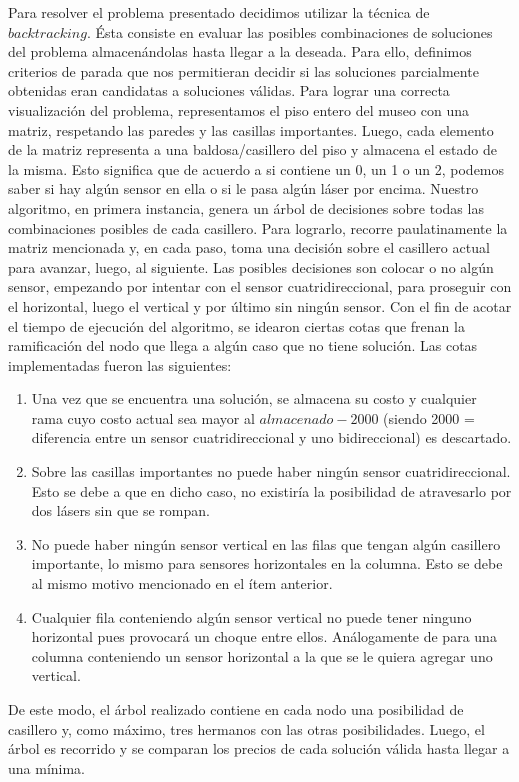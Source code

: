 Para resolver el problema presentado decidimos utilizar la técnica de $backtracking$. Ésta consiste en evaluar las posibles combinaciones de soluciones del problema almacenándolas hasta llegar a la deseada. Para ello, definimos criterios de parada que nos permitieran decidir si las soluciones parcialmente obtenidas eran candidatas a soluciones válidas.\newline
\newline
Para lograr una correcta visualización del problema, representamos el piso entero del museo con una matriz, respetando las paredes y las casillas importantes. Luego, cada elemento de la matriz representa a una baldosa/casillero del piso y almacena el estado de la misma. Esto significa que de acuerdo a si contiene un 0, un 1 o un 2, podemos saber si hay algún sensor en ella o si le pasa algún láser por encima.\newline
\newline
Nuestro algoritmo, en primera instancia, genera un árbol de decisiones sobre todas las combinaciones posibles de cada casillero. Para lograrlo, recorre paulatinamente la matriz mencionada y, en cada paso, toma una decisión sobre el casillero actual para avanzar, luego, al siguiente. Las posibles decisiones son colocar o no algún sensor, empezando por intentar con el sensor cuatridireccional, para proseguir con el horizontal, luego el vertical y por último sin ningún sensor. Con el fin de acotar el tiempo de ejecución del algoritmo, se idearon ciertas cotas que frenan la ramificación del nodo que llega a algún caso que no tiene solución. Las cotas implementadas fueron las siguientes:
\begin{enumerate}
\item Una vez que se encuentra una solución, se almacena su costo y cualquier rama cuyo costo actual sea mayor al $almacenado-2000$ (siendo 2000 = diferencia entre un sensor cuatridireccional y uno bidireccional) es descartado.
\item Sobre las casillas importantes no puede haber ningún sensor cuatridireccional. Esto se debe a que en dicho caso, no existiría la posibilidad de atravesarlo por dos lásers sin que se rompan.
\item No puede haber ningún sensor vertical en las filas que tengan algún casillero importante, lo mismo para sensores horizontales en la columna. Esto se debe al mismo motivo mencionado en el ítem anterior.
\item Cualquier fila conteniendo algún sensor vertical no puede tener ninguno horizontal pues provocará un choque entre ellos. Análogamente de para una columna conteniendo un sensor horizontal a la que se le quiera agregar uno vertical.
\end{enumerate}
De este modo, el árbol realizado contiene en cada nodo una posibilidad de casillero y, como máximo, tres hermanos con las otras posibilidades. Luego, el árbol es recorrido y se comparan los precios de cada solución válida hasta llegar a una mínima.\newline
\newline

